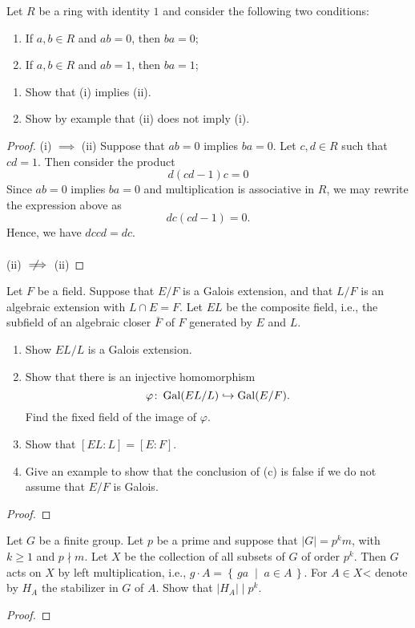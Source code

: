\begin{problem}
Let $R$ be a ring with identity $1$ and consider the following two
conditions:
\begin{center}
\begin{enumerate}[label=(\roman*)]
\item If $a,b\in R$ and $ab=0$, then $ba=0$;
\item If $a,b\in R$ and $ab=1$, then $ba=1$;
\end{enumerate}
\end{center}
\begin{enumerate}[label=(\alph*)]
\item Show that (i) implies (ii).
\item Show by example that (ii) does not imply (i).
\end{enumerate}
\end{problem}
\begin{proof}
(i) $\implies$ (ii) Suppose that $ab=0$ implies $ba=0$. Let $c,d\in R$ such
that $cd=1$. Then consider the product
\[
d(cd-1)c=0
\]
Since $ab=0$ implies $ba=0$ and multiplication is associative in $R$, we
may rewrite the expression above as
\[
dc(cd-1)=0.
\]
Hence, we have $dccd=dc$.
\\\\
(ii) $\nimplies$ (ii)
\end{proof}

\begin{problem}
Let $F$ be a field. Suppose that $E/F$ is a Galois extension, and that
$L/F$ is an algebraic extension with $L\cap E=F$. Let $EL$ be the composite
field, i.e., the subfield of an algebraic closer $\bar F$ of $F$ generated
by $E$ and $L$.
\begin{enumerate}[label=(\alph*)]
\item Show $EL/L$ is a Galois extension.
\item Show that there is an injective homomorphism
\[\varphi\colon\operatorname{Gal}(EL/L)\hookrightarrow\operatorname{Gal}(E/F).\]
Find the fixed field of the image of $\varphi$.
\item Show that $[EL:L]=[E:F]$.
\item Give an example to show that the conclusion of (c) is false if we do
  not assume that $E/F$ is Galois.
\end{enumerate}
\end{problem}
\begin{proof}
\end{proof}

\begin{problem}
Let $G$ be a finite group. Let $p$ be a prime and suppose that $|G|=p^km$,
with $k\geq 1$ and $p\nmid m$. Let $X$ be the collection of all subsets of
$G$ of order $p^k$. Then $G$ acts on $X$ by left multiplication, i.e.,
$g\cdot A=\left\{\,ga\;\middle|\;a\in A\,\right\}$. For $A\in X$< denote by
$H_A$ the stabilizer in $G$ of $A$. Show that $|H_A|\mid p^k$.
\end{problem}
\begin{proof}
\end{proof}

